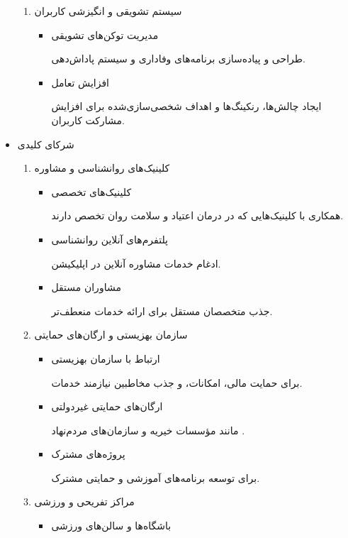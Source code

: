 \documentclass[dvipsnames, svgnames, x11names, 11pt]{article}
\begin{document}
\begin{itemize}
\begin{enumerate}
\item 
سیستم تشویقی و انگیزشی کاربران  

\begin{itemize}
\item 
مدیریت توکن‌های تشویقی

طراحی و پیاده‌سازی برنامه‌های وفاداری و سیستم پاداش‌دهی.  

\item 
افزایش تعامل

ایجاد چالش‌ها، رنکینگ‌ها و اهداف شخصی‌سازی‌شده برای افزایش مشارکت کاربران.  
\end{itemize}
\end{enumerate}

\item 
شرکای کلیدی

\begin{enumerate}
\item 
کلینیک‌های روانشناسی و مشاوره  

\begin{itemize}
\item 
کلینیک‌های تخصصی

همکاری با کلینیک‌هایی که در درمان اعتیاد و سلامت روان تخصص دارند.  

\item 
پلتفرم‌های آنلاین روانشناسی

ادغام خدمات مشاوره آنلاین در اپلیکیشن.  

\item 
مشاوران مستقل

جذب متخصصان مستقل برای ارائه خدمات منعطف‌تر.  
\end{itemize}

\item 
سازمان بهزیستی و ارگان‌های حمایتی  
\begin{itemize}
\item 
ارتباط با سازمان بهزیستی

برای حمایت مالی، امکانات، و جذب مخاطبین نیازمند خدمات.  

\item 
ارگان‌های حمایتی غیردولتی

مانند مؤسسات خیریه و سازمان‌های مردم‌نهاد .  

\item 
پروژه‌های مشترک

برای توسعه برنامه‌های آموزشی و حمایتی مشترک.  
\end{itemize}

\item 
مراکز تفریحی و ورزشی  
\begin{itemize}
\item 
باشگاه‌ها و سالن‌های ورزشی


\end{itemize}
\end{enumerate}
\end{itemize}
\end{document}
